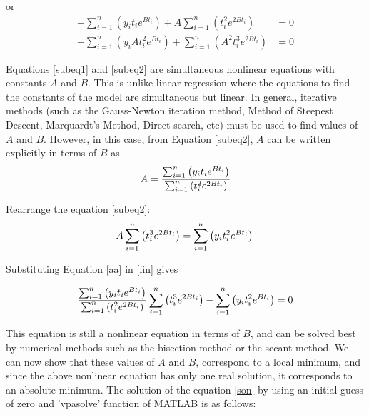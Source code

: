 \documentclass[12pt, a4paper]{article}
\numberwithin{equation}{section}
\begin{document}
or
\begin{subequations}
\begin{align}
 -\sum_{i=1}^n \left(y_it_ie^{Bt_i}\right) + A\sum_{i=1}^n \left(t_i^2e^{2Bt_i}\right) &=0 \label{subeq1}\\
-\sum_{i=1}^n \left(y_iAt_i^2e^{Bt_i}\right) + \sum_{i=1}^n \left(A^2t_i^3e^{2Bt_i}\right) &=0  \label{subeq2}
\end{align}
\end{subequations}

Equations \ref{subeq1} and \ref{subeq2} are simultaneous nonlinear equations with constants $A$ and $B$. This is unlike linear regression where the equations to find the constants of the model are simultaneous but linear. In general, iterative methods (such as the Gauss-Newton iteration method, Method of Steepest Descent, Marquardt's Method, Direct search, etc) must be used to find values of $A$ and $B$.
However, in this case, from Equation \ref{subeq2}, $A$ can be written explicitly in terms of $B$ as
\begin{equation}
\label{aa}
A = \frac{\sum_{i=1}^n \left(y_it_ie^{Bt_i}\right)}{\sum_{i=1}^n \left(t_i^2e^{2Bt_i}\right)} \\    
\end{equation}

Rearrange the equation \ref{subeq2}:
\begin{equation}
    \label{fin}
    A\sum_{i=1}^n \left(t_i^3e^{2Bt_i}\right) = \sum_{i=1}^n \left(y_it_i^2e^{Bt_i}\right)\\
\end{equation}


Substituting Equation \ref{aa} in \ref{fin} gives

\begin{equation}
\label{son}
\frac{\sum_{i=1}^n \left(y_it_ie^{Bt_i}\right)}{\sum_{i=1}^n \left(t_i^2e^{2Bt_i}\right)} \sum_{i=1}^n \left(t_i^3e^{2Bt_i}\right) - \sum_{i=1}^n \left(y_it_i^2e^{Bt_i}\right) = 0\\    
\end{equation}

This equation is still a nonlinear equation in terms of $B$, and can be solved best by numerical methods such as the bisection method or the secant method.
We can now show that these values of $A$ and $B$, correspond to a local minimum, and since the above nonlinear equation has only one real solution, it corresponds to an absolute minimum. The solution of the equation \ref{son} by using an initial guess of zero and 'vpasolve' function of MATLAB is as follows:
\end{document}
